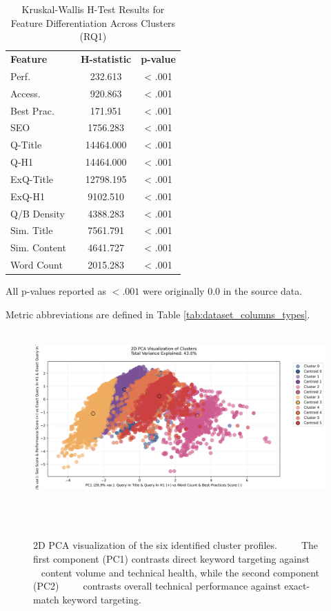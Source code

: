 \documentclass[a4paper,fleqn]{cas-sc}
\newcommand{\sbf}[1]{\scriptsize\textbf{#1}}
\newcommand{\dmidrule}{\specialrule{0.8pt}{0pt}{0.4pt}\specialrule{0.8pt}{0pt}{0pt}}
\begin{document}
\begin{table}[htbp!]
\centering
\caption{Kruskal-Wallis H-Test Results for Feature Differentiation Across Clusters (RQ1)}
\label{app:rq1_cluster_validation_table}
\small
\setlength{\tabcolsep}{3pt}
\renewcommand{\arraystretch}{1}
\begin{threeparttable}
\begin{tabular*}{\textwidth}{l@{\extracolsep{\fill}} S[table-format=5.3] S[table-format=1.3,table-comparator=true]}
\toprule
\sbf{Feature} & {\sbf{H-statistic}} & {\sbf{p-value}} \\
\dmidrule
Perf.  & 232.613 & < .001 \\
Access.  & 920.863 & < .001 \\
Best Prac.  & 171.951 & < .001 \\
SEO  & 1756.283 & < .001 \\
Q-Title  & 14464.000 & < .001 \\
Q-H1  & 14464.000 & < .001 \\
ExQ-Title  & 12798.195 & < .001 \\
ExQ-H1  & 9102.510 & < .001 \\
Q/B Density  & 4388.283 & < .001 \\
Sim. Title  & 7561.791 & < .001 \\
Sim. Content  & 4641.727 & < .001 \\
Word Count  & 2015.283 & < .001 \\
\bottomrule
\end{tabular*}
\begin{tablenotes}[flushleft]
\scriptsize
\item All p-values reported as $< .001$ were originally $0.0$ in the source data.
\item Metric abbreviations are defined in Table \ref{tab:dataset_columns_types}.
\end{tablenotes}
\end{threeparttable}
\end{table}


\begin{figure}[htbp!]
 \centering
    \includegraphics[width=\columnwidth]{figs/rq1_cluster_pca_2d.png}
    \caption{2D PCA visualization of the six identified cluster profiles. 
    The first component (PC1) contrasts direct keyword targeting against 
    content volume and technical health, while the second component (PC2) 
    contrasts overall technical performance against exact-match keyword targeting.}
    \label{fig:pca_visualization}
\end{figure}
\end{document}
